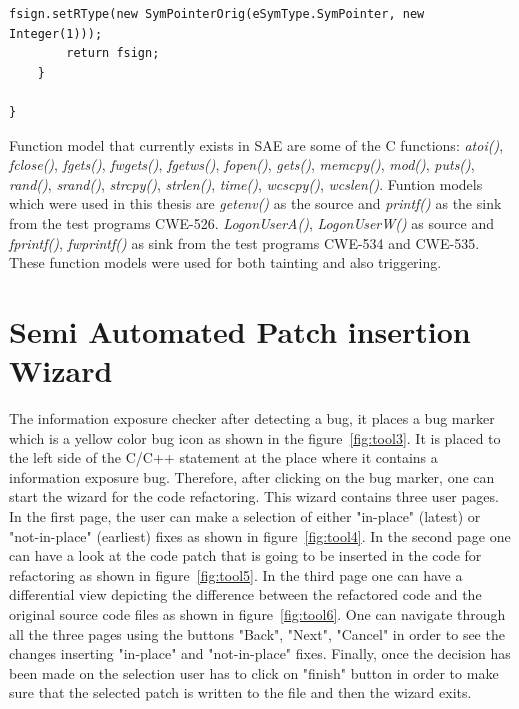 \begin{lstlisting}[caption={Function model of printf()},label={lst:printf()}]
		fsign.setRType(new SymPointerOrig(eSymType.SymPointer, new Integer(1)));
		return fsign;
	}

}
\end{lstlisting}


Function model that currently exists in SAE are some of the C functions:
\emph{atoi()}, \emph{fclose()}, \emph{fgets()}, \emph{fwgets()},
\emph{fgetws()}, \emph{fopen()}, \emph{gets()}, \emph{memcpy()}, \emph{mod()},
\emph{puts()}, \emph{rand()}, \emph{srand()}, \emph{strcpy()}, \emph{strlen()},
\emph{time()}, \emph{wcscpy()}, \emph{wcslen()}.
Funtion models which were used in this thesis are \emph{getenv()}
as the source and \emph{printf()} as the sink from the test programs CWE-526.
\emph{LogonUserA()}, \emph{LogonUserW()} as source and \emph{fprintf()}, \emph{fwprintf()} as sink
from the test programs CWE-534 and CWE-535.
These function models were used for both tainting and also triggering.



\section{Semi Automated Patch insertion Wizard}
\label{semi:insert}
The information exposure checker after detecting a bug, it places
a bug marker which is a yellow color bug icon
as shown in the figure~\ref{fig:tool3}. It is placed to the left side
of the C/C++ statement at the place where it contains a information
exposure bug. Therefore, after clicking on the bug marker, one
can start the wizard for the code refactoring. This wizard
contains three user pages. In the first page, the user can make
a selection of either "in-place" (latest) or
"not-in-place" (earliest) fixes as shown in figure~\ref{fig:tool4}.  
In the second page one can have a look at the code patch that
is going to be inserted in the code for refactoring as shown in figure~\ref{fig:tool5}. In the third
page one can have a differential view depicting the 
difference between the refactored code and the original 
source code files as shown in figure~\ref{fig:tool6}. One can navigate through all the three pages 
using the buttons "Back", "Next", "Cancel" in order to see the 
changes inserting "in-place" and "not-in-place" fixes.
Finally, once the decision has been made on the selection
user has to click on "finish" button in order to make sure that
the selected patch is written to the file and then the wizard 
exits.

